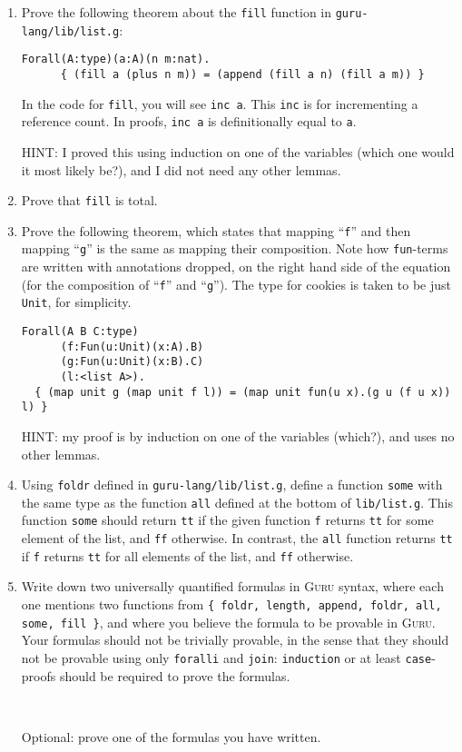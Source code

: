 \documentclass{book}[12pt]
\newcommand{\guru}[0]{\textsc{Guru}\xspace}
\begin{document}
\begin{enumerate}
\item Prove the following theorem about the \texttt{fill} function in \texttt{guru-lang/lib/list.g}:

\begin{verbatim}
Forall(A:type)(a:A)(n m:nat).
      { (fill a (plus n m)) = (append (fill a n) (fill a m)) }
\end{verbatim}

\noindent In the code for \texttt{fill}, you will see \texttt{inc a}.
This \texttt{inc} is for incrementing a reference count.  In proofs,
\texttt{inc a} is definitionally equal to \texttt{a}.

\noindent HINT: I proved this using induction on one of the variables
(which one would it most likely be?), and I did not need any other
lemmas.

\item Prove that \texttt{fill} is total.

\item Prove the following theorem, which states that mapping
``\texttt{f}'' and then mapping ``\texttt{g}'' is the same as mapping
their composition.  Note how \texttt{fun}-terms are written with
annotations dropped, on the right hand side of the equation (for the
composition of ``\texttt{f}'' and ``\texttt{g}'').  The type for cookies
is taken to be just \texttt{Unit}, for simplicity.

\begin{verbatim}
Forall(A B C:type)
      (f:Fun(u:Unit)(x:A).B)
      (g:Fun(u:Unit)(x:B).C)
      (l:<list A>).
  { (map unit g (map unit f l)) = (map unit fun(u x).(g u (f u x)) l) } 
\end{verbatim}

\noindent HINT: my proof is by induction on one of the variables (which?), and
uses no other lemmas.

\item Using \texttt{foldr} defined in \texttt{guru-lang/lib/list.g},
define a function \texttt{some} with the same type as the function
\texttt{all} defined at the bottom of \texttt{lib/list.g}.  This
function \texttt{some} should return \texttt{tt} if the given function
\texttt{f} returns \texttt{tt} for some element of the list, and
\texttt{ff} otherwise.  In contrast, the \texttt{all} function returns
\texttt{tt} if \texttt{f} returns \texttt{tt} for all elements of the
list, and \texttt{ff} otherwise.

\item Write down two universally quantified formulas in \guru syntax,
where each one mentions two functions from \texttt{\{ foldr, length,
append, foldr, all, some, fill \}}, and where you believe the formula
to be provable in \guru.  Your formulas should not be trivially
provable, in the sense that they should not be provable using only
\texttt{foralli} and \texttt{join}: \texttt{induction} or at least
\texttt{case}-proofs should be required to prove the formulas.  

\ 

Optional: prove one of the formulas you have written.

\end{enumerate}
\end{document}
